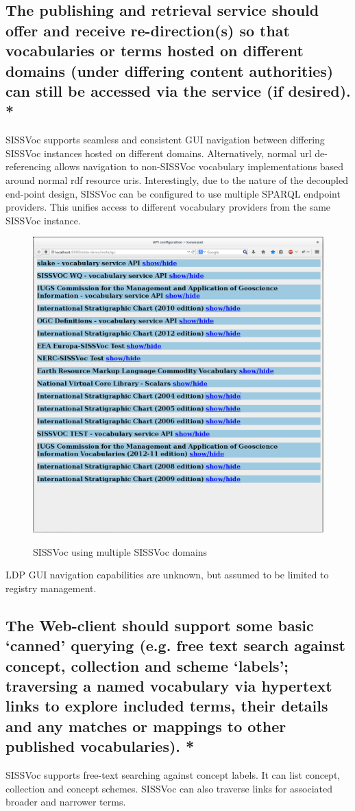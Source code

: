 \documentclass[10pt,a4paper]{article}
\begin{document}
\begin{flushleft}
\subsection{ The publishing and retrieval service should offer and receive
re-direction(s) so that vocabularies or terms hosted on different domains (under
differing content authorities) can still be accessed via the service (if
desired). * }

{
SISSVoc supports seamless and consistent GUI navigation between differing
SISSVoc instances hosted on different domains.
%
Alternatively, normal url de-referencing allows navigation to non-SISSVoc
vocabulary implementations based around normal rdf resource uris.
%
Interestingly, due to the nature of the decoupled end-point design, SISSVoc 
can be configured to use multiple SPARQL endpoint providers. This unifies access
to different vocabulary providers from the same SISSVoc instance. 

\begin{figure}[H]
\centering
\caption{SISSVoc using multiple SISSVoc domains}
\includegraphics[width=12cm]{multipleendpoints}  
\label{fig:test}
\end{figure}

LDP GUI navigation capabilities are unknown, but assumed to be limited to 
registry management.
}
%
%
\subsection{ The Web-client should support some basic ‘canned’ querying (e.g.
free text search against concept, collection and scheme ‘labels’; traversing a
named vocabulary via hypertext links to explore included terms, their details
and any matches or mappings to other published vocabularies). * }
%
SISSVoc supports free-text searching against concept labels. It can list
concept, collection and concept schemes. SISSVoc can also traverse links 
for associated broader and narrower terms. 


\end{flushleft}
\end{document}
